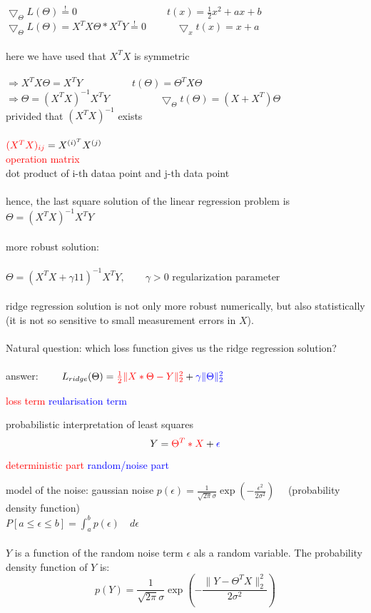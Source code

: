 \documentclass[a4paper, 12pt]{scrartcl}
\begin{document}
$\bigtriangledown_{\Theta} L(\Theta) \stackrel{!}{=} 0 \quad\quad\quad\quad\quad\quad\quad\quad\quad  t(x) = \frac{1}{2}x^2+ax+b$\\
$\bigtriangledown_{\Theta} L(\Theta) = X^T X \Theta * X^T Y \stackrel{!}{=} 0  \quad\quad\quad \bigtriangledown_x t(x) = x+a$\\\\
here we have used that $X^T X$ is symmetric\\\\
$\Rightarrow X^T X \Theta = X^T Y \quad\quad\quad\quad\quad t(\Theta) = \Theta^T X \Theta$\\
$\Rightarrow  \Theta = (X^T X)^{-1} X^T Y \quad\quad\quad\quad\quad \bigtriangledown_{\Theta} t(\Theta) = (X+X^T)\Theta$\\
privided that $(X^T X)^{-1}$ exists\\\\
$\textcolor{red}{(X^T X)_{ij}} = X^{(i)^T}X^{(j)}$\\
\textcolor{red}{operation matrix}\\
dot product of i-th dataa point and j-th data point\\\\
hence, the last square solution of the linear regression problem is $\Theta = (X^T X)^{-1} X^T Y$\\\\
more robust solution:\\\\
$\Theta = (X^T X + \gamma 11)^{-1} X^T Y, \quad\quad \gamma > 0$ regularization parameter\\\\
ridge regression solution is not only more robust numerically, but also statistically (it is not so sensitive to small measurement errors in $X$).\\\\
Natural question: which loss function gives us the ridge regression solution?\\\\
answer: $\quad\quad L_{ridge} (\Theta)= \textcolor{red}{\frac{1}{2} \lVert X * \Theta - Y \lVert_2^2} + \textcolor{blue}{\gamma \lVert \Theta \lVert_2^2}$
\begin{center}
\textcolor{red}{loss term} \space\space \textcolor{blue}{reularisation term}
\end{center}
probabilistic interpretation of least squares
\[ Y = \textcolor{red}{\Theta^T * X} + \textcolor{blue}{\epsilon} \]
\begin{center}
\textcolor{red}{deterministic part} \space\space \textcolor{blue}{random/noise part}
\end{center}
model of the noise: gaussian noise \space\space $p(\epsilon)= \frac{1}{\sqrt{2\pi}\sigma} \exp (- \frac{\epsilon^2}{2 \sigma^2}) \quad$ (probability density function)\\
$P[a \leq \epsilon \leq b] = \int_a^b p(\epsilon)\quad d\epsilon$\\\\
$Y$ is a function of the random noise term $\epsilon$ als a random variable. The probability density function of $Y$ is:
\[ p(Y) = \frac{1}{\sqrt{2 \pi}\sigma} \exp(- \frac{\lVert Y - \Theta^T X \lVert^2_2}{2 \sigma^2})\]
\end{document}
